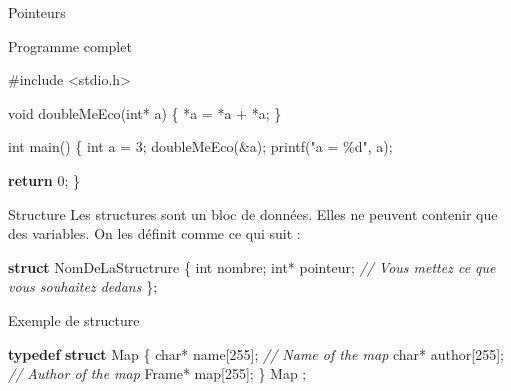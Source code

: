 \documentclass[
  10pt,
  french,
  ignorenonframetext,
  aspectratio=169,
]{beamer}
\newenvironment{Shaded}{}{}
\newcommand{\CommentTok}[1]{\textcolor[rgb]{0.38,0.63,0.69}{\textit{#1}}}
\newcommand{\ControlFlowTok}[1]{\textcolor[rgb]{0.00,0.44,0.13}{\textbf{#1}}}
\newcommand{\DataTypeTok}[1]{\textcolor[rgb]{0.56,0.13,0.00}{#1}}
\newcommand{\DecValTok}[1]{\textcolor[rgb]{0.25,0.63,0.44}{#1}}
\newcommand{\ImportTok}[1]{#1}
\newcommand{\KeywordTok}[1]{\textcolor[rgb]{0.00,0.44,0.13}{\textbf{#1}}}
\newcommand{\NormalTok}[1]{#1}
\newcommand{\OperatorTok}[1]{\textcolor[rgb]{0.40,0.40,0.40}{#1}}
\newcommand{\PreprocessorTok}[1]{\textcolor[rgb]{0.74,0.48,0.00}{#1}}
\newcommand{\StringTok}[1]{\textcolor[rgb]{0.25,0.44,0.63}{#1}}
\begin{document}
\begin{frame}[fragile]{Pointeurs}
\protect\hypertarget{pointeurs-3}{}
\begin{block}{Programme complet}
\protect\hypertarget{programme-complet}{}
\begin{Shaded}
\begin{Highlighting}[]
\PreprocessorTok{\#include }\ImportTok{\textless{}stdio.h\textgreater{}}

\DataTypeTok{void}\NormalTok{ doubleMeEco}\OperatorTok{(}\DataTypeTok{int}\OperatorTok{*}\NormalTok{ a}\OperatorTok{)} \OperatorTok{\{}
    \OperatorTok{*}\NormalTok{a }\OperatorTok{=} \OperatorTok{*}\NormalTok{a }\OperatorTok{+} \OperatorTok{*}\NormalTok{a}\OperatorTok{;}
\OperatorTok{\}}

\DataTypeTok{int}\NormalTok{ main}\OperatorTok{()}
\OperatorTok{\{}
    \DataTypeTok{int}\NormalTok{ a }\OperatorTok{=}  \DecValTok{3}\OperatorTok{;}
\NormalTok{    doubleMeEco}\OperatorTok{(\&}\NormalTok{a}\OperatorTok{);}
\NormalTok{    printf}\OperatorTok{(}\StringTok{"a = \%d"}\OperatorTok{,}\NormalTok{ a}\OperatorTok{);}

    \ControlFlowTok{return} \DecValTok{0}\OperatorTok{;}
\OperatorTok{\}}
\end{Highlighting}
\end{Shaded}
\end{block}
\end{frame}

\begin{frame}[fragile]{Structure}
\protect\hypertarget{structure}{}
Les structures sont un bloc de données. Elles ne peuvent contenir que
des variables. On les définit comme ce qui suit :

\begin{Shaded}
\begin{Highlighting}[]
\KeywordTok{struct}\NormalTok{ NomDeLaStructrure }\OperatorTok{\{}
    \DataTypeTok{int}\NormalTok{ nombre}\OperatorTok{;}
    \DataTypeTok{int}\OperatorTok{*}\NormalTok{ pointeur}\OperatorTok{;}
    \CommentTok{// Vous mettez ce que vous souhaitez dedans}
\OperatorTok{\};}
\end{Highlighting}
\end{Shaded}

\begin{block}{Exemple de structure}
\protect\hypertarget{exemple-de-structure}{}
\begin{Shaded}
\begin{Highlighting}[]
\KeywordTok{typedef} \KeywordTok{struct}\NormalTok{ Map}
\OperatorTok{\{}
    \DataTypeTok{char}\OperatorTok{*}\NormalTok{ name}\OperatorTok{[}\DecValTok{255}\OperatorTok{];} \CommentTok{// Name of the map}
    \DataTypeTok{char}\OperatorTok{*}\NormalTok{ author}\OperatorTok{[}\DecValTok{255}\OperatorTok{];} \CommentTok{// Author of the map}
\NormalTok{    Frame}\OperatorTok{*}\NormalTok{ map}\OperatorTok{[}\DecValTok{255}\OperatorTok{];}
\OperatorTok{\}}\NormalTok{ Map }\OperatorTok{;}
\end{Highlighting}
\end{Shaded}
\end{block}
\end{frame}
\end{document}
